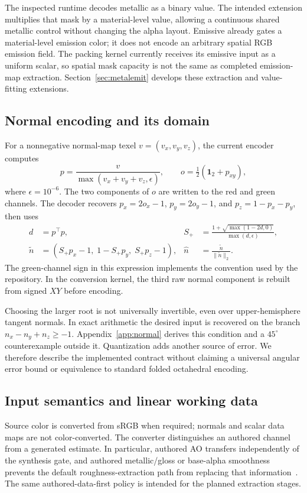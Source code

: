 \documentclass[11pt,letterpaper]{article}
\newcommand{\one}{\mathbf{1}}
\begin{document}
The inspected runtime decodes metallic as a binary value. The intended extension multiplies that mask by a material-level value, allowing a continuous shared metallic control without changing the alpha layout. Emissive already gates a material-level emission color; it does not encode an arbitrary spatial RGB emission field. The packing kernel currently receives its emissive input as a uniform scalar, so spatial mask capacity is not the same as completed emission-map extraction. Section~\ref{sec:metalemit} develops these extraction and value-fitting extensions.

\subsection{Normal encoding and its domain}
For a nonnegative normal-map texel $v=(v_x,v_y,v_z)$, the current encoder computes
\begin{equation}
p=\frac{v}{\max(v_x+v_y+v_z,\epsilon)},
\qquad o=\tfrac12(\one_{2}+p_{xy}),
\label{eq:normalencode}
\end{equation}
where $\epsilon=10^{-6}$. The two components of $o$ are written to the red and green channels. The decoder recovers $p_x=2o_x-1$, $p_y=2o_y-1$, and $p_z=1-p_x-p_y$, then uses
\begin{align}
d&=p^\top p, &
S_+&=\frac{1+\sqrt{\max(1-2d,0)}}{\max(d,\epsilon)},\\
\widetilde n&=(S_+p_x-1,\;1-S_+p_y,\;S_+p_z-1), &
\widehat n&=\frac{\widetilde n}{\|\widetilde n\|_2}.
\label{eq:normaldecode}
\end{align}
The green-channel sign in this expression implements the convention used by the repository. In the conversion kernel, the third raw normal component is rebuilt from signed $XY$ before encoding.

Choosing the larger root is not universally invertible, even over upper-hemisphere tangent normals. In exact arithmetic the desired input is recovered on the branch $n_x-n_y+n_z\ge-1$. Appendix~\ref{app:normal} derives this condition and a $45^\circ$ counterexample outside it. Quantization adds another source of error. We therefore describe the implemented contract without claiming a universal angular error bound or equivalence to standard folded octahedral encoding.


\subsection{Input semantics and linear working data}
Source color is converted from sRGB when required; normals and scalar data maps are not color-converted. The converter distinguishes an authored channel from a generated estimate. In particular, authored AO transfers independently of the synthesis gate, and authored metallic/gloss or base-alpha smoothness prevents the default roughness-extraction path from replacing that information~\cite{namer2026}. The same authored-data-first policy is intended for the planned extraction stages.
\end{document}
